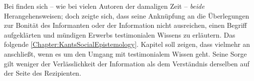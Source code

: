 Bei  finden sich -- wie bei vielen Autoren der damaligen
Zeit -- \emph{beide} Herangehensweisen; doch zeigte sich, dass seine Anknüpfung
an die Überlegungen zur Bonität des Informanten oder der Information nicht
ausreichen, einen Begriff aufgeklärten und mündigen Erwerbs testimonialen
Wissens zu erläutern. Das folgende \ref{Chapter:KantsSocialEpistemology}.
Kapitel soll zeigen, dass  vielmehr an
 anschließt,
wenn es um den Umgang mit testimonialem Wissen geht. Seine Sorge gilt weniger
der Verlässlichkeit der Information als dem Verständnis derselben auf der Seite
des Rezipienten.
